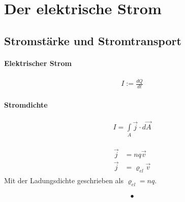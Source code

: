 \section{Der elektrische Strom}
\subsection{Stromstärke und Stromtransport}

\paragraph{Elektrischer Strom}
\begin{align} \label{def:Strom}
\boxed{I := \frac{dQ}{dt}}
\end{align}

\paragraph{Stromdichte}

\begin{align} 
I = \int \limits_A \vec{j} \cdot d\vec{A}
\end{align}


\begin{align} \label{eqn:Stromdichte}\begin{split}
\vec{j} &= nq\vec{v} \\
\vec{j}	&= \varrho_{el}\vec{v}\end{split}
\end{align}Mit der Ladungsdichte geschrieben als $\varrho_{el} = nq$.

\begin{align} \label{eqn:}
•
\end{align}
